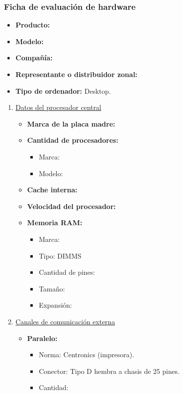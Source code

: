 \subsubsection{Ficha de evaluación de hardware}
\begin{itemize}
  \item \textbf{Producto:}
  \item \textbf{Modelo:}
  \item \textbf{Compañía:}
  \item \textbf{Representante o distribuidor zonal:}
  \item \textbf{Tipo de ordenador:} Desktop.
\end{itemize}

\begin{enumerate}

  \item \underline{Datos del procesador central}
  \begin{itemize}
    \item \textbf{Marca de la placa madre:}
    
    \item \textbf{Cantidad de procesadores:}
    \begin{itemize}
      \item Marca:
      \item Modelo:
    \end{itemize}
    
    \item \textbf{Cache interna:}
    \item \textbf{Velocidad del procesador:}
    \item \textbf{Memoria RAM:}
    
    \begin{itemize}
      \item Marca:
      \item Tipo: DIMMS
      \item Cantidad de pines:
      \item Tamaño:
      \item Expansión:
    \end{itemize}
  \end{itemize}
  
  
  \item \underline{Canales de comunicación externa}
  \begin{itemize}
    \item \textbf{Paralelo:}
    \begin{itemize}
      \item Norma: Centronics (impresora).
      \item Conector: Tipo D hembra a chasis de 25 pines.
      \item Cantidad:
    \end{itemize}
    

\end{itemize}
\end{enumerate}
